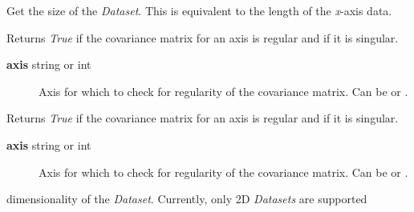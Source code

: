 \documentclass[letterpaper,10pt,english]{sphinxmanual}
\begin{document}
\begin{fulllineitems}
\begin{fulllineitems}
\begin{description}
\end{description}

\end{fulllineitems}


\begin{fulllineitems}
\label{api/kafe:kafe.dataset.Dataset.get_size}
Get the size of the \emph{Dataset}. This is equivalent to the length of the \emph{x}-axis data.

\end{fulllineitems}


\begin{fulllineitems}
\label{api/kafe:kafe.dataset.Dataset.has_correlations}
Returns \emph{True} if the covariance matrix for an axis is regular and  if it is
singular.
\begin{description}
\item[{\textbf{axis} string or int}] \leavevmode
Axis for which to check for regularity of the covariance matrix. Can be  or .

\end{description}

\end{fulllineitems}


\begin{fulllineitems}
\label{api/kafe:kafe.dataset.Dataset.has_errors}
Returns \emph{True} if the covariance matrix for an axis is regular and  if it is
singular.
\begin{description}
\item[{\textbf{axis} string or int}] \leavevmode
Axis for which to check for regularity of the covariance matrix. Can be  or .

\end{description}

\end{fulllineitems}


\begin{fulllineitems}
\label{api/kafe:kafe.dataset.Dataset.n_axes}
dimensionality of the \emph{Dataset}. Currently, only 2D \emph{Datasets} are supported


\end{fulllineitems}
\end{fulllineitems}
\end{document}
